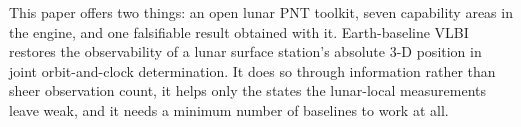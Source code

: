 This paper offers two things: an open lunar PNT toolkit, seven capability areas
in the  engine, and one falsifiable result obtained with it.
Earth-baseline VLBI restores the observability of a lunar surface station's
absolute 3-D position in joint orbit-and-clock determination. It does so through
information rather than sheer observation count, it helps only the states the
lunar-local measurements leave weak, and it needs a minimum number of baselines
to work at all.
